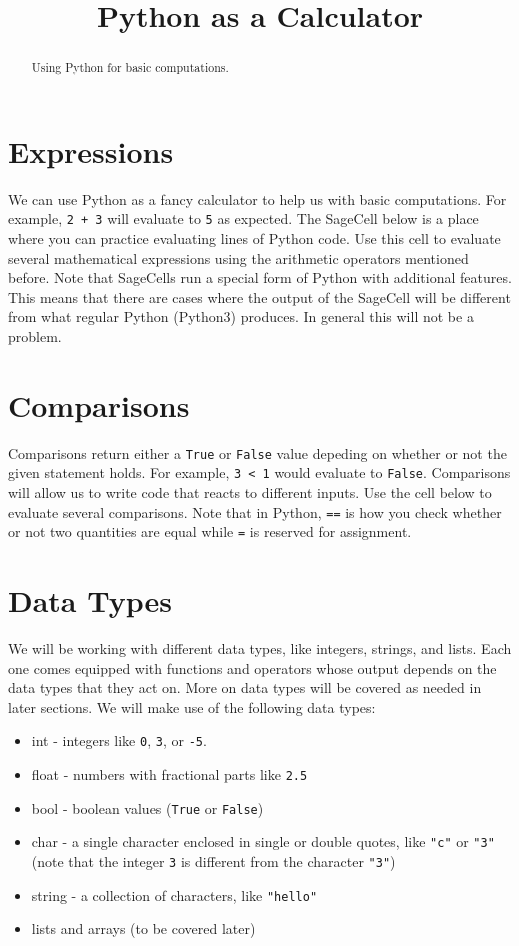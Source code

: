 \documentclass{ximera}
\title{Python as a Calculator}
\begin{document}
  
\begin{abstract}  
Using Python for basic computations.
\end{abstract}  
\maketitle

\section{Expressions}

We can use Python as a fancy calculator to help us with basic computations. For example, \verb|2 + 3| will evaluate to \verb|5| as expected. The SageCell below is a place where you can practice evaluating lines of Python code. Use this cell to evaluate several mathematical expressions using the arithmetic operators mentioned before. Note that SageCells run a special form of Python with additional features. This means that there are cases where the output of the SageCell will be different from what regular Python (Python3) produces. In general this will not be a problem.

\section{Comparisons}

Comparisons return either a \verb|True| or \verb|False| value depeding on whether or not the given statement holds. For example, \verb|3 < 1| would evaluate to \verb|False|. Comparisons will allow us to write code that reacts to different inputs. Use the cell below to evaluate several comparisons. Note that in Python, \verb|==| is how you check whether or not two quantities are equal while \verb|=| is reserved for assignment.

\section{Data Types}

We will be working with different data types, like integers, strings, and lists. Each one comes equipped with functions and operators whose output depends on the data types that they act on. More on data types will be covered as needed in later sections. We will make use of the following data types:

\begin{itemize}
	\item int - integers like \verb|0|, \verb|3|, or \verb|-5|.
	\item float - numbers with fractional parts like \verb|2.5|
	\item bool - boolean values (\verb|True| or \verb|False|)
	\item char - a single character enclosed in single or double quotes, like \verb|"c"| or \verb|"3"| (note that the integer \verb|3| is different from the character \verb|"3"|)
	\item string - a collection of characters, like \verb|"hello"|
	\item lists and arrays (to be covered later)
\end{itemize}
\end{document}
